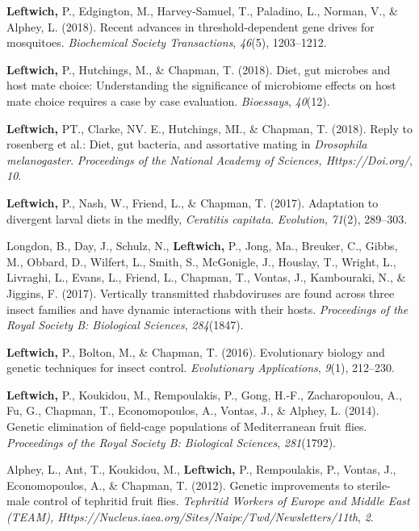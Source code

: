 \documentclass[11pt, a4paper]{awesome-cv}
\begin{document}
\leavevmode\hypertarget{ref-5}{}%
\textbf{Leftwich,} P., Edgington, M., Harvey-Samuel, T., Paladino, L.,
Norman, V., \& Alphey, L. (2018). Recent advances in threshold-dependent
gene drives for mosquitoes. \emph{Biochemical Society Transactions},
\emph{46}(5), 1203--1212.

\leavevmode\hypertarget{ref-12}{}%
\textbf{Leftwich,} P., Hutchings, M., \& Chapman, T. (2018). Diet, gut
microbes and host mate choice: Understanding the significance of
microbiome effects on host mate choice requires a case by case
evaluation. \emph{Bioessays}, \emph{40}(12).

\leavevmode\hypertarget{ref-8}{}%
\textbf{Leftwich,} PT., Clarke, NV. E., Hutchings, MI., \& Chapman, T.
(2018). Reply to rosenberg et al.: Diet, gut bacteria, and assortative
mating in \emph{{Drosophila} melanogaster}. \emph{Proceedings of the
National Academy of Sciences, Https://Doi.org/}, \emph{10}.

\leavevmode\hypertarget{ref-9}{}%
\textbf{Leftwich,} P., Nash, W., Friend, L., \& Chapman, T. (2017).
Adaptation to divergent larval diets in the medfly, \emph{{Ceratitis}
capitata}. \emph{Evolution}, \emph{71}(2), 289--303.

\leavevmode\hypertarget{ref-7}{}%
Longdon, B., Day, J., Schulz, N., \textbf{Leftwich,} P., Jong, Ma.,
Breuker, C., Gibbs, M., Obbard, D., Wilfert, L., Smith, S., McGonigle,
J., Houslay, T., Wright, L., Livraghi, L., Evans, L., Friend, L.,
Chapman, T., Vontas, J., Kambouraki, N., \& Jiggins, F. (2017).
Vertically transmitted rhabdoviruses are found across three insect
families and have dynamic interactions with their hosts.
\emph{Proceedings of the Royal Society B: Biological Sciences},
\emph{284}(1847).

\leavevmode\hypertarget{ref-1}{}%
\textbf{Leftwich,} P., Bolton, M., \& Chapman, T. (2016). Evolutionary
biology and genetic techniques for insect control. \emph{Evolutionary
Applications}, \emph{9}(1), 212--230.

\leavevmode\hypertarget{ref-2}{}%
\textbf{Leftwich,} P., Koukidou, M., Rempoulakis, P., Gong, H.-F.,
Zacharopoulou, A., Fu, G., Chapman, T., Economopoulos, A., Vontas, J.,
\& Alphey, L. (2014). Genetic elimination of field-cage populations of
{Mediterranean} fruit flies. \emph{Proceedings of the Royal Society B:
Biological Sciences}, \emph{281}(1792).

\leavevmode\hypertarget{ref-18}{}%
Alphey, L., Ant, T., Koukidou, M., \textbf{Leftwich,} P., Rempoulakis,
P., Vontas, J., Economopoulos, A., \& Chapman, T. (2012). Genetic
improvements to sterile-male control of tephritid fruit flies.
\emph{Tephritid Workers of Europe and Middle East (TEAM),
Https://Nucleus.iaea.org/Sites/Naipc/Twd/Newsletters/11th}, \emph{2}.
\end{document}

